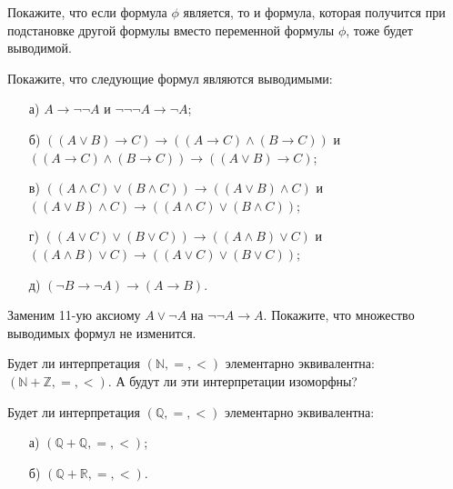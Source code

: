 \begin{task}
	Покажите, что если формула $\phi$ является, то и формула, которая получится при подстановке другой формулы вместо переменной
    формулы $\phi$, тоже будет выводимой.
\end{task}

\begin{task}
	Покажите, что следующие формул являются выводимыми:
    \begin{enumerate}[topsep = 0pt, itemsep = -1ex]
        \item [а)] $A \to \lnot \lnot A$ и $\lnot \lnot \lnot A \to \lnot A$;
        \item [б)] $((A \lor B) \to C) \to ((A \to C) \land (B \to C))$ и $((A \to C) \land (B \to C)) \to ((A \lor B) \to C)$;
        \item [в)] $((A \land C) \lor (B \land C)) \to ((A \lor B) \land C)$ и $((A \lor B) \land C) \to ((A \land C) \lor (B
			\land C))$;
        \item [г)] $((A \lor C) \lor (B \lor C)) \to ((A \land B) \lor C)$ и $((A \land B) \lor C) \to ((A \lor C) \lor
            (B \lor C))$;
        \item [д)] $(\lnot B \to \lnot A) \to (A \to B)$.
    \end{enumerate}
\end{task}

\begin{task}
	Заменим 11-ую аксиому $A \lor \lnot A$ на $\lnot \lnot A \to A$. Покажите, что множество выводимых формул не изменится.
\end{task}


\breakline

\begin{ptask}{51}
    Будет ли интерпретация $(\mathbb{N}, =, <)$ элементарно эквивалентна: $(\mathbb{N} + \mathbb{Z}, =, <)$. А будут ли эти
    интерпретации изоморфны?
\end{ptask}

\begin{ptask}{52}
    Будет ли интерпретация $(\mathbb{Q}, =, <)$ элементарно эквивалентна:
    \begin{enumerate}[topsep = 0pt, itemsep = -1ex]
        \item [а)] $(\mathbb{Q} + \mathbb{Q}, =, <)$;
        \item [б)] $(\mathbb{Q} + \mathbb{R}, =, <)$.
    \end{enumerate}
\end{ptask}